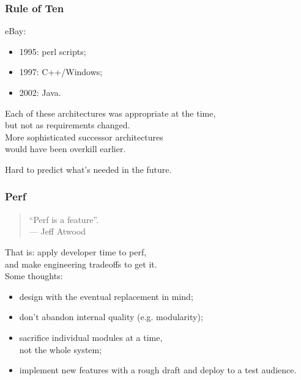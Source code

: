 \begin{frame}
\frametitle{Rule of Ten}

\large
\begin{changemargin}{1cm}
eBay:
\begin{itemize}
\item 1995: perl scripts;
\item 1997: C++/Windows;
\item 2002: Java.
\end{itemize}

Each of these architectures was appropriate at the time, \\
but not as requirements changed. \\[1em]

More sophisticated successor architectures \\
would have been overkill earlier.

Hard to predict what's needed in the future.
\end{changemargin}

\end{frame}



\begin{frame}
\frametitle{Perf}

\large
\begin{changemargin}{1cm}
\begin{quote}
``Perf is a feature''.\\
\hfill --- Jeff Atwood
\end{quote}
That is: apply developer time to perf, \\
and make engineering tradeoffs to get it.\\[1em]

Some thoughts:
\begin{itemize}
\item design with the eventual replacement in mind;
\item don't abandon internal quality (e.g. modularity);
\item sacrifice individual modules at a time,\\
not the whole system;
\item implement new features with a rough draft and deploy to a test audience.
\end{itemize}
\end{changemargin}


\end{frame}




